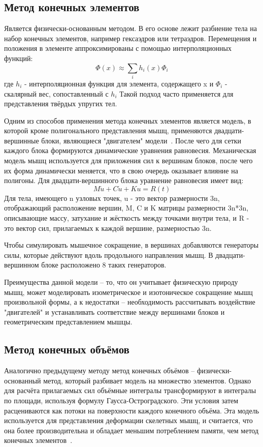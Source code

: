 \subsection{Метод конечных элементов}
\label{subsec:FEM}
Является физически-основанным методом. В его основе лежит разбиение тела на набор конечных элементов, например гексаэдров или тетраэдров. Перемещения и положения в элементе аппроксимированы с помощью интерполяционных функций:
\begin{equation}\label{eq:FEM}
\Phi(x)\approx\sum_{i}h_{i}(x)\Phi_{i}
\end{equation}
где $h_{i}$ - интерполяционная функция для элемента, содержащего x и $\Phi_{i}$ - скалярный вес, сопоставленный с $h_{i}$ Такой подход часто применяется для представления твёрдых упругих тел. \par Одним из способов применения метода конечных элементов является модель, в которой кроме полигонального представления мышц, применяются двадцати-вершинные блоки, являющиеся "двигателем" модели~\cite{chen}. После чего для сетки каждого блока формируются динамические уравнения равновесия. Механическая модель мышц используется для приложения сил к вершинам блоков,  после чего их форма динамически меняется, что в свою очередь оказывает влияние на полигоны. Для двадцати-вершинного блока уравнение равновесия имеет вид:
\begin{equation}\label{key}
M\ddot{u}+C\dot{u}+Ku=R(t)
\end{equation}
Для тела, имеющего n узловых точек, u - это вектор размерности 3n, отображающий расположение вершин, M, C и K матрицы размерности 3n*3n, описывающие массу, затухание и жёсткость между точками внутри тела, и R - это вектор сил, прилагаемых к каждой вершине, размерностью 3n.
\par Чтобы симулировать мышечное сокращение, в вершинах добавляются генераторы силы, которые действуют вдоль продольного направления мышц. В двадцати-вершинном блоке расположено 8 таких генераторов.
\par Преимущества данной модели -- то, что он учитывает физическую природу мышц, может моделировать изометрическое и изотоническое сокращение мышц произвольной формы, а к недостатки -- необходимость рассчитывать воздействие "двигателей" и устанавливать соответствие между вершинами блоков и геометрическим представлением мышцы.

\subsection{Метод конечных объёмов}
\label{subsec:FVM}
Аналогично предыдущему методу метод конечных объёмов -- физически-основанный метод, который разбивает модель на множество элементов. Однако для расчёта прилагаемых сил объёмные интегралы трансформируют в интегралы по площади, используя формулу Гаусса-Остроградского. Эти условия затем расцениваются как потоки на поверхности каждого конечного объёма. Эта модель используется для представления деформации скелетных мышц, и считается, что она более производительна и обладает меньшим потреблением памяти, чем метод конечных элементов~\cite{teran}.
